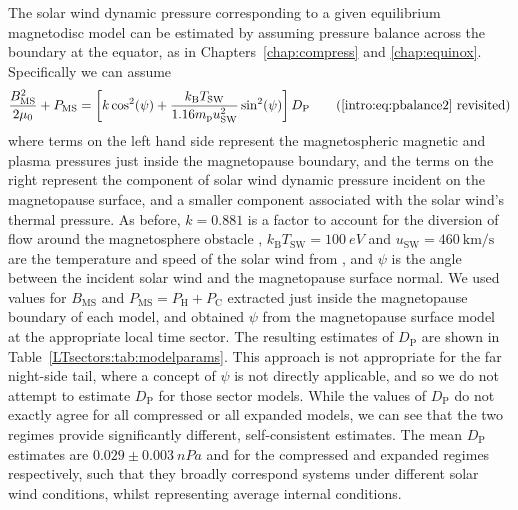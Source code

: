 The solar wind dynamic pressure corresponding to a given equilibrium magnetodisc model can be estimated by assuming pressure balance across the boundary at the equator, as in Chapters~\ref{chap:compress} and \ref{chap:equinox}. Specifically we can assume
\begin{equation}\label{LTsectors:eq:pbalance}
\frac{B_\mathrm{MS}^2}{2\mu_0} + P_\mathrm{MS} = \left[k\cos^2(\psi) + \frac{k_\mathrm{B}T_\mathrm{SW}}{1.16m_\mathrm{p}u_\mathrm{SW}^2}\sin^2(\psi)\right] D_\mathrm{P} \tag{\ref{intro:eq:pbalance2} revisited}
\end{equation}
where terms on the left hand side represent the magnetospheric magnetic and plasma pressures just inside the magnetopause boundary, and the terms on the right represent the component of solar wind dynamic pressure incident on the magnetopause surface, and a smaller component associated with the solar wind's thermal pressure. As before, $k = 0.881$ is a factor to account for the diversion of flow around the magnetosphere obstacle \citep[see][]{spreiter1966}, $k_\mathrm{B}T_\mathrm{SW} = \SI{100}{eV}$ and $u_\mathrm{SW} = \SI{460}{\km\per\second}$ are the temperature and speed of the solar wind from \citet{pilkington2015}, and $\psi$ is the angle between the incident solar wind and the magnetopause surface normal. We used values for $B_\mathrm{MS}$ and $P_\mathrm{MS} = P_\mathrm{H} + P_\mathrm{C}$ extracted just inside the magnetopause boundary of each model, and obtained $\psi$ from the \citet{pilkington2015b} magnetopause surface model at the appropriate local time sector. The resulting estimates of $D_\mathrm{P}$ are shown in Table~\ref{LTsectors:tab:modelparams}. This approach is not appropriate for the far night-side tail, where a concept of $\psi$ is not directly applicable, and so we do not attempt to estimate $D_\mathrm{P}$ for those sector models. While the values of $D_\mathrm{P}$ do not exactly agree for all compressed or all expanded models, we can see that the two regimes provide significantly different, self-consistent estimates. The mean $D_\mathrm{P}$ estimates are $0.029\pm\SI{0.003}{nPa}$ and  for the compressed and expanded regimes respectively, such that they broadly correspond systems under different solar wind conditions, whilst representing average internal conditions.

